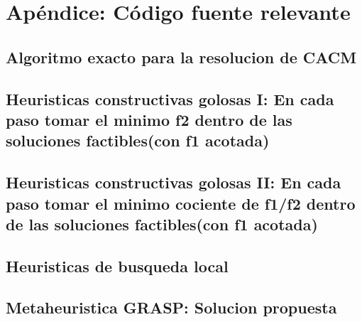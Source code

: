 \section{Ap\'endice: C\'odigo fuente relevante}


\subsection{Algoritmo exacto para la resolucion de CACM}


\subsection{Heuristicas constructivas golosas I: En cada paso tomar el minimo f2 dentro de las soluciones factibles(con f1 acotada)}


\subsection{Heuristicas constructivas golosas II: En cada paso tomar el minimo cociente de f1/f2 dentro de las soluciones factibles(con f1 acotada)}


\subsection{Heuristicas de busqueda local}


\subsection{Metaheuristica GRASP: Solucion propuesta}

